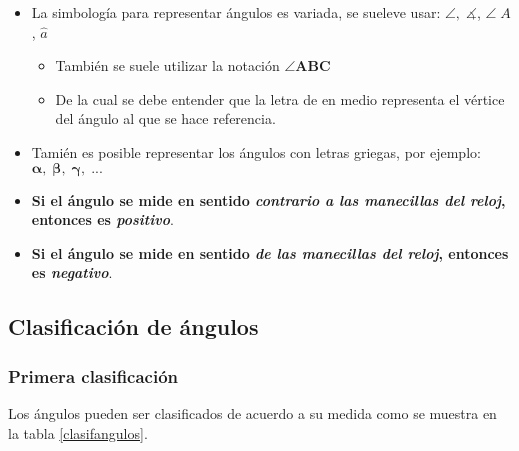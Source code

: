 \begin{itemize}
	\item La simbología para representar ángulos es variada, se sueleve usar: 
	$\pmb{\angle,\; \measuredangle}$, $\angle\; A$, $\hat{a}$
	\begin{itemize}
		\item También se suele utilizar la notación $\pmb{\angle ABC}$
		\item De la cual se debe entender que la letra de en medio representa el 
		vértice del ángulo al que se hace referencia.
	\end{itemize}
	\item Tamién es posible representar los ángulos con letras griegas,
	por ejemplo: $\pmb{\alpha,\; \beta,\; \gamma,\; ...}$
	\item \textbf{Si el ángulo se mide en sentido \textit{contrario a las 
	manecillas del reloj}, entonces es \textit{positivo}}.
	\item \textbf{Si el ángulo se mide en sentido \textit{de las 
	manecillas del reloj}, entonces es \textit{negativo}}.
\end{itemize}

\subsection{Clasificación de ángulos}

\subsubsection{Primera clasificación}

Los ángulos pueden ser clasificados de acuerdo a su medida como se muestra en la
tabla \ref{clasifangulos}.

